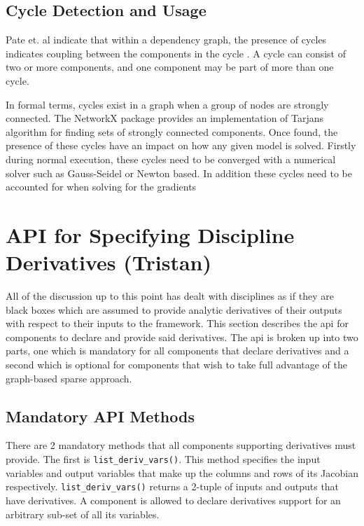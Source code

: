 \documentclass[]{aiaa-tc} %
\begin{document}
    \subsection{Cycle Detection and Usage}
        Pate et. al indicate that within a dependency graph, the presence of cycles indicates coupling between
        the components in the cycle \cite{graph_problem2013}. A cycle can consist of two or more components, and
        one component may be part of more than one cycle.

        In formal terms, cycles exist in a graph when a group of nodes are strongly connected. The NetworkX package
        provides an implementation of Tarjans algorithm for finding sets of strongly connected
        components\cite{tarjan1972depth,nuutila1994finding}. Once found, the presence of these cycles
        have an impact on how any given model is solved. Firstly during normal execution, these cycles
        need to be converged with a numerical solver such as Gauss-Seidel or Newton based.
        In addition these cycles need to be accounted for when solving for the gradients


    \section{API for Specifying Discipline Derivatives (Tristan)}

        All of the discussion up to this point has dealt with disciplines as if they are black boxes 
        which are assumed to provide analytic derivatives of their outputs with respect to their inputs 
        to the framework. This section describes the api for components to declare and provide 
        said derivatives. The api is broken up into two parts, one which is mandatory for all components 
        that declare derivatives and a second which is optional for components that wish to take full 
        advantage of the graph-based sparse approach. 

        \subsection{Mandatory API Methods}

        There are 2 mandatory methods that all components supporting derivatives must provide. 
        The first is \texttt{list\_deriv\_vars()}. This method specifies the
        input variables and output variables that make up the columns and rows of its Jacobian respectively.  
        \texttt{list\_deriv\_vars()} returns a 2-tuple of inputs and outputs that have derivatives. 
        A component is allowed to declare derivatives support for an arbitrary sub-set of all its variables. 
\end{document}
